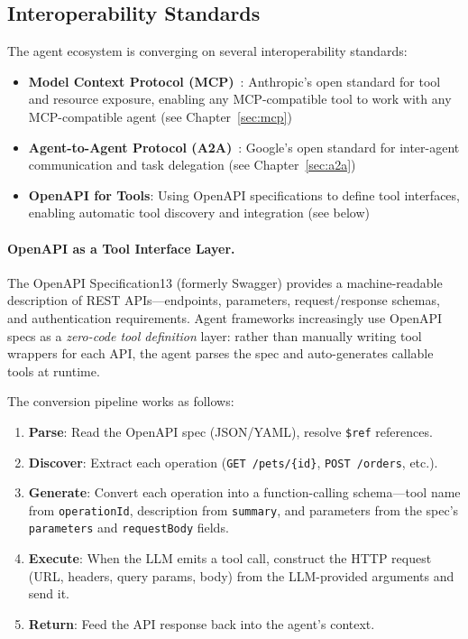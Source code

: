 \subsection{Interoperability Standards}
\label{interoperability-standards}

The agent ecosystem is converging on several interoperability standards:

\begin{itemize}
  \item \textbf{Model Context Protocol (MCP)}~\cite{anthropic-mcp-2024}: Anthropic’s open standard for tool and resource exposure, enabling any MCP-compatible tool to work with any MCP-compatible agent (see Chapter~\ref{sec:mcp})
  \item \textbf{Agent-to-Agent Protocol (A2A)}~\cite{google-a2a-2025}: Google’s open standard for inter-agent communication and task delegation (see Chapter~\ref{sec:a2a})
  \item \textbf{OpenAPI for Tools}: Using OpenAPI specifications to define tool interfaces, enabling automatic tool discovery and integration (see below)
\end{itemize}

\paragraph{OpenAPI as a Tool Interface Layer.}
\label{openapi-as-a-tool-interface-layer.}

The OpenAPI Specification13 (formerly Swagger) provides a machine-readable description of REST APIs---endpoints, parameters, request/response schemas, and authentication requirements. Agent frameworks increasingly use OpenAPI specs as a \emph{zero-code tool definition} layer: rather than manually writing tool wrappers for each API, the agent parses the spec and auto-generates callable tools at runtime.

The conversion pipeline works as follows:

\begin{enumerate}
  \item \textbf{Parse}: Read the OpenAPI spec (JSON/YAML), resolve \texttt{\$ref} references.
  \item \textbf{Discover}: Extract each operation (\verb|GET /pets/{id}|, \texttt{POST /orders}, etc.).
  \item \textbf{Generate}: Convert each operation into a function-calling schema---tool name from \texttt{operationId}, description from \texttt{summary}, and parameters from the spec’s \texttt{parameters} and \texttt{requestBody} fields.
  \item \textbf{Execute}: When the LLM emits a tool call, construct the HTTP request (URL, headers, query params, body) from the LLM-provided arguments and send it.
  \item \textbf{Return}: Feed the API response back into the agent’s context.
\end{enumerate}

